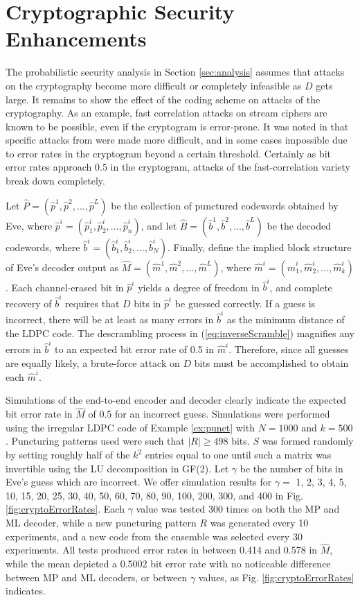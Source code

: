 \documentclass[10pt,twocolumn,twoside]{IEEEtran} \newlength{\pic}
\theoremstyle{definition}
\theoremstyle{remark}
\theoremstyle{plain}
\begin{document}
\section{Cryptographic Security Enhancements}\label{sec:crypto}
The probabilistic security analysis in Section \ref{sec:analysis} assumes that attacks on the cryptography become more difficult or completely infeasible as $D$ gets large. It remains to show the effect of the coding scheme on attacks of the cryptography. As an example, fast correlation attacks on stream ciphers are known to be possible, even if the cryptogram is error-prone. It was noted in \cite{Harrison09_ICC,Harrison09_ISIT,Harrison09_ITW} that specific attacks from \cite{Meier89} were made more difficult, and in some cases impossible due to error rates in the cryptogram beyond a certain threshold. Certainly as bit error rates approach 0.5 in the cryptogram, attacks of the fast-correlation variety break down completely.

Let $\hat{P}=(\hat{p}^1,\hat{p}^2,\ldots,\hat{p}^L)$ be the collection of punctured codewords obtained by Eve, where $\hat{p}^i = (\hat{p}^i_1,\hat{p}^i_2,\ldots,\hat{p}^i_n)$, and let $\hat{B}=(\hat{b}^1,\hat{b}^2,\ldots,\hat{b}^L)$ be the decoded codewords, where $\hat{b}^i = (\hat{b}^i_1,\hat{b}^i_2,\ldots,\hat{b}^i_N)$. Finally, define the implied block structure of Eve's decoder output as $\hat{M}=(\hat{m}^1,\hat{m}^2,\ldots,\hat{m}^L)$, where $\hat{m}^i=(\hat{m}^i_1,\hat{m}^i_2,\ldots,\hat{m}^i_k)$. Each channel-erased bit in $\hat{p}^i$ yields a degree of freedom in $\hat{b}^i$, and complete recovery of $\hat{b}^i$ requires that $D$ bits in $\hat{p}^i$ be guessed correctly. If a guess is incorrect, there will be at least as many errors in $\hat{b}^i$ as the minimum distance of the LDPC code. The descrambling process in (\ref{eq:inverseScramble}) magnifies any errors in $\hat{b}^i$ to an expected bit error rate of 0.5 in $\hat{m}^i$. Therefore, since all guesses are equally likely, a brute-force attack on $D$ bits must be accomplished to obtain each $\hat{m}^i$.

Simulations of the end-to-end encoder and decoder clearly indicate the expected bit error rate in $\hat{M}$ of 0.5 for an incorrect guess. Simulations were performed using the irregular LDPC code of Example \ref{ex:punct} with $N=1000$ and $k=500$. Puncturing patterns used were such that $|R|\geq 498$ bits. $S$ was formed randomly by setting roughly half of the $k^2$ entries equal to one until such a matrix was invertible using the LU decomposition in GF(2). Let $\gamma$ be the number of bits in Eve's guess which are incorrect. We offer simulation results for $\gamma =$ 1, 2, 3, 4, 5, 10, 15, 20, 25, 30, 40, 50, 60, 70, 80, 90, 100, 200, 300, and 400 in Fig. \ref{fig:cryptoErrorRates}. Each $\gamma$ value was tested 300 times on both the MP and ML decoder, while a new puncturing pattern $R$ was generated every 10 experiments, and a new code from the ensemble was selected every 30 experiments. All tests produced error rates in between 0.414 and 0.578 in $\hat{M}$, while the mean depicted a 0.5002 bit error rate with no noticeable difference between MP and ML decoders, or between $\gamma$ values, as Fig. \ref{fig:cryptoErrorRates} indicates.
\end{document}
